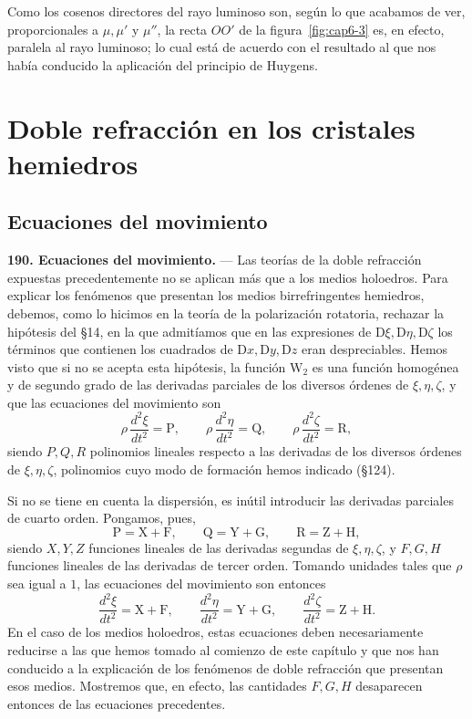 Como los cosenos directores del rayo luminoso son, según lo que acabamos
de ver, proporcionales a $\mu,\mu'$ y $\mu''$, la recta $OO'$ de la
figura~\ref{fig:cap6-3} es, en efecto, paralela al rayo luminoso; lo cual
está de acuerdo con el resultado al que nos había conducido la aplicación
del principio de Huygens.

\section{Doble refracción en los cristales hemiedros}

\subsection{Ecuaciones del movimiento}

\noindent\textbf{190. Ecuaciones del movimiento.} — Las teorías de la
doble refracción expuestas precedentemente no se aplican más que a los
medios holoedros. Para explicar los fenómenos que presentan los medios
birrefringentes hemiedros, debemos, como lo hicimos en la teoría de la
polarización rotatoria, rechazar la hipótesis del §14, en la que
admitíamos que en las expresiones de $\mathrm{D}\xi,\mathrm{D}\eta,\mathrm{D}\zeta$ los términos que
contienen los cuadrados de $\mathrm{D}x,\mathrm{D}y,\mathrm{D}z$ eran despreciables. Hemos visto que
si no se acepta esta hipótesis, la función $\mathrm{W}_2$ es una función homogénea
y de segundo grado de las derivadas parciales de los diversos órdenes de
$\xi,\eta,\zeta$, y que las ecuaciones del movimiento son
\[
\rho\,\frac{d^2\xi}{dt^2}=\mathrm P,\qquad
\rho\,\frac{d^2\eta}{dt^2}=\mathrm Q,\qquad
\rho\,\frac{d^2\zeta}{dt^2}=\mathrm R,
\]
siendo $P,Q,R$ polinomios lineales respecto a las derivadas de los
diversos órdenes de $\xi,\eta,\zeta$, polinomios cuyo modo de formación
hemos indicado (§124).

Si no se tiene en cuenta la dispersión, es inútil introducir las
derivadas parciales de cuarto orden. Pongamos, pues,
\[
\mathrm P=\mathrm X+\mathrm F,\qquad \mathrm Q=\mathrm Y+\mathrm G,\qquad \mathrm R=\mathrm Z+\mathrm H,
\]
siendo $X,Y,Z$ funciones lineales de las derivadas segundas de
$\xi,\eta,\zeta$, y $F,G,H$ funciones lineales de las derivadas de tercer
orden. Tomando unidades tales que $\rho$ sea igual a $1$, las ecuaciones
del movimiento son entonces
\[
\frac{d^2\xi}{dt^2}=\mathrm X+\mathrm F,\qquad
\frac{d^2\eta}{dt^2}=\mathrm Y+\mathrm G,\qquad
\frac{d^2\zeta}{dt^2}=\mathrm Z+\mathrm H.
\]
En el caso de los medios holoedros, estas ecuaciones deben necesariamente
reducirse a las que hemos tomado al comienzo de este capítulo y que nos
han conducido a la explicación de los fenómenos de doble refracción que
presentan esos medios. Mostremos que, en efecto, las cantidades $F,G,H$
desaparecen entonces de las ecuaciones precedentes.

